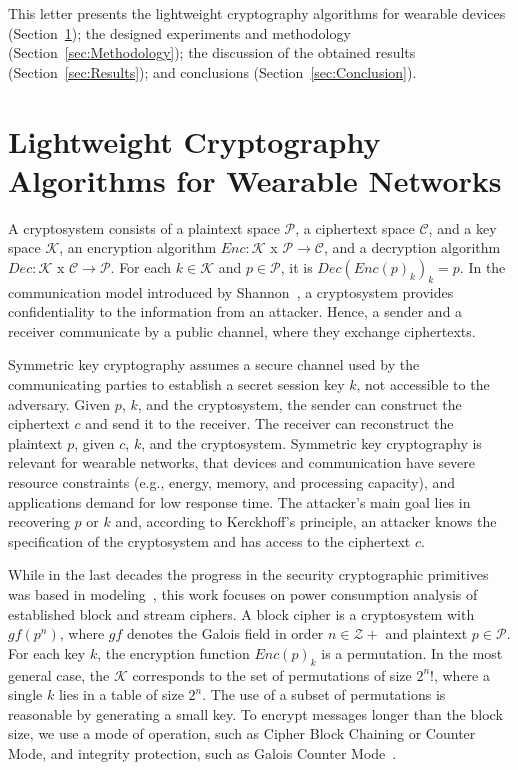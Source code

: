 \documentclass[journal]{IEEEtran}
\begin{document}
This letter presents the lightweight cryptography algorithms for wearable devices (Section~\ref{sec:Background}); the designed experiments and methodology (Section~\ref{sec:Methodology}); the discussion of the obtained results (Section~\ref{sec:Results}); and conclusions (Section~\ref{sec:Conclusion}).

\vspace{-0.25cm}
\section{Lightweight Cryptography Algorithms for Wearable Networks}
\label{sec:Background}

 A cryptosystem consists of a plaintext space $\mathcal{P}$, a ciphertext space $\mathcal{C}$, and a key space $\mathcal{K}$, an encryption algorithm $Enc: \mathcal{K}$ x $\mathcal{P} \rightarrow \mathcal{C}$, and a decryption algorithm $Dec: \mathcal{K}$ x $\mathcal{C} \rightarrow \mathcal{P}$. For each $k \in \mathcal{K}$ and $p \in \mathcal{P}$, it is $Dec(Enc(p)_k)_k = p$. In the communication model introduced by Shannon~\cite{shannon}, a cryptosystem provides confidentiality to the information from an attacker. Hence, a sender and a receiver communicate by a public channel, where they exchange ciphertexts. 

Symmetric key cryptography assumes a secure channel used by the communicating parties to establish a secret session key $k$, not accessible to the adversary. Given $p$, $k$, and the cryptosystem, the sender can construct the ciphertext $c$ and send it to the receiver. The receiver can reconstruct the plaintext $p$, given $c$, $k$, and the cryptosystem. Symmetric key cryptography is relevant for wearable networks, that devices and communication have severe resource constraints (e.g., energy, memory, and processing capacity), and applications demand for low response time. The attacker's main goal lies in recovering $p$ or $k$ and, according to Kerckhoff’s principle, an attacker knows the specification of the cryptosystem and has access to the ciphertext $c$. 

 While in the last decades the progress in the security cryptographic primitives was based in modeling~\cite{KatzL2014}, this work focuses on power consumption analysis of established block and stream ciphers. A block cipher is a cryptosystem with $gf(p^n)$, where $gf$ denotes the Galois field in order $n \in \mathcal{Z+}$ and plaintext $p \in \mathcal{P}$.
For each key $k$, the encryption function $Enc(p)_k$ is a permutation. In the most general case, the $\mathcal{K}$ corresponds to the set of permutations of size $2^n!$, where a single $k$ lies in a table of size $2^n$. The use of a subset of permutations is reasonable by generating a small key. To encrypt messages longer than the block size, we use a mode of operation, such as Cipher Block Chaining or Counter Mode, and integrity protection, such as Galois Counter Mode~\cite{KatzL2014}. 
\end{document}
